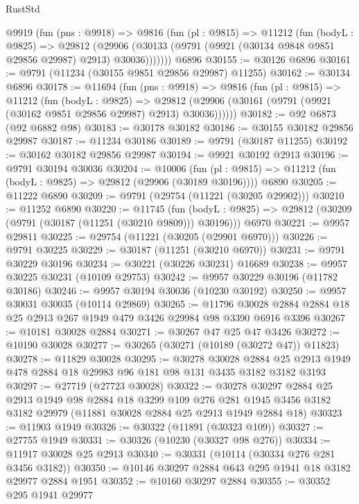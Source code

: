 \begin{lexlean}{RustStd}
\begin{coremodule}
    @9919
      (fun (pns : @9918) =>
      @9816
        (fun (pl : @9815) =>
        @11212
          (fun (bodyL : @9825) =>
          @29812
            (@29906 (@30133 (@9791 (@9921 (@30134 @9848 @9851 @29856 @29987) @2913) @30036)))))))
    @6896
@30155 := @30126 @6896
@30161 := @9791 (@11234 (@30155 @9851 @29856 @29987) @11255)
@30162 := @30134 @6896
@30178 := @11694
    (fun (pns : @9918) =>
    @9816
      (fun (pl : @9815) =>
      @11212
        (fun (bodyL : @9825) =>
        @29812 (@29906 (@30161 (@9791 (@9921 (@30162 @9851 @29856 @29987) @2913) @30036))))))
@30182 := @92 @6873 (@92 @6882 @98)
@30183 := @30178 @30182
@30186 := @30155 @30182 @29856 @29987
@30187 := @11234 @30186
@30189 := @9791 (@30187 @11255)
@30192 := @30162 @30182 @29856 @29987
@30194 := @9921 @30192 @2913
@30196 := @9791 @30194 @30036
@30204 := @10006
    (fun (pl : @9815) => @11212 (fun (bodyL : @9825) => @29812 (@29906 (@30189 @30196))))
    @6890
@30205 := @11222 @6890
@30209 := @9791 (@29754 (@11221 (@30205 @29902)))
@30210 := @11252 @6890
@30220 := @11745
    (fun (bodyL : @9825) => @29812 (@30209 (@9791 (@30187 (@11251 (@30210 @9809))) @30196)))
    @6970
@30221 := @9957 @29811
@30225 := @29754 (@11221 (@30205 (@29901 @6970)))
@30226 := @9791 @30225
@30229 := @30187 (@11251 (@30210 @6970))
@30231 := @9791 @30229 @30196
@30234 := @30221 (@30226 @30231) @16689
@30238 := @9957 @30225 @30231 (@10109 @29753)
@30242 := @9957 @30229 @30196 (@11782 @30186)
@30246 := @9957 @30194 @30036 (@10230 @30192)
@30250 := @9957 @30031 @30035 (@10114 @29869)
@30265 := @11796 @30028 @2884 @2884 @18 @25 @2913 @267 @1949 @479 @3426 @29984 @98 @3390 @6916 @3396
@30267 := @10181 @30028 @2884
@30271 := @30267 @47 @25 @47 @3426
@30272 := @10190 @30028
@30277 := @30265 (@30271 (@10189 (@30272 @47)) @11823)
@30278 := @11829 @30028
@30295 := @30278
    @30028
    @2884
    @25
    @2913
    @1949
    @478
    @2884
    @18
    @29983
    @96
    @181
    @98
    @131
    @3435
    @3182
    @3182
    @3193
@30297 := @27719 (@27723 @30028)
@30322 := @30278
    @30297
    @2884
    @25
    @2913
    @1949
    @98
    @2884
    @18
    @3299
    @109
    @276
    @281
    @1945
    @3456
    @3182
    @3182
    @29979
    (@11881 @30028 @2884 @25 @2913 @1949 @2884 @18)
@30323 := @11903 @1949
@30326 := @30322 (@11891 (@30323 @109))
@30327 := @27755 @1949
@30331 := @30326 (@10230 (@30327 @98 @276))
@30334 := @11917 @30028 @25 @2913
@30340 := @30331 (@10114 (@30334 @276 @281 @3456 @3182))
@30350 := @10146 @30297 @2884 @643 @295 @1941 @18 @3182 @29977 @2884 @1951
@30352 := @10160 @30297 @2884
@30355 := @30352 @295 @1941 @29977

\end{coremodule}
\end{lexlean}
